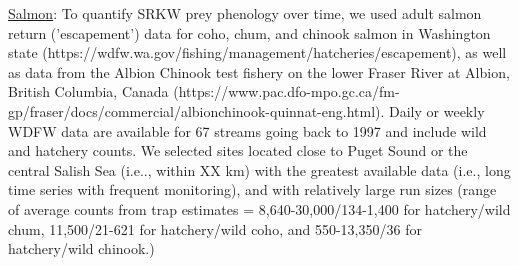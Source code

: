 \documentclass{article}
\begin{document}
\par \underline{Salmon}: To quantify SRKW prey phenology over time, we used adult salmon return ('escapement') data for coho, chum, and chinook salmon in Washington state (https://wdfw.wa.gov/fishing/management/hatcheries/escapement), as well as data from the Albion Chinook test fishery on the lower Fraser River at Albion, British Columbia, Canada (https://www.pac.dfo-mpo.gc.ca/fm-gp/fraser/docs/commercial/albionchinook-quinnat-eng.html). Daily or weekly WDFW data are available for 67 streams going back to 1997 and include wild and hatchery counts. We selected sites located close to Puget Sound or the central Salish Sea (i.e.., within XX km) with the greatest available data (i.e., long time series with frequent monitoring), and with relatively large run sizes (range of average counts from trap estimates = 8,640-30,000/134-1,400 for hatchery/wild chum, 11,500/21-621 for hatchery/wild coho, and 550-13,350/36 for hatchery/wild chinook.)
\end{document}
